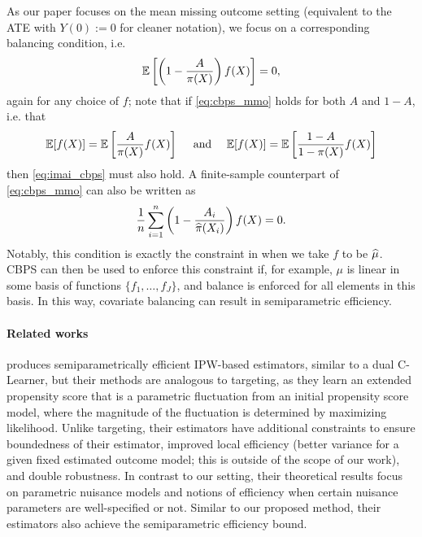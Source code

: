 As our paper focuses on the mean missing outcome setting (equivalent to the ATE with $Y(0):=0$ for cleaner notation), 
we focus on a corresponding balancing condition, i.e. \citep{tan2010bounded}
\begin{align}
\label{eq:cbps_mmo}
\mathbb{E}\left[\left( 1 - \frac{A}{ \pi(X)}\right) f(X) \right]=0,   
\end{align}
again for any choice of $f$; note that if \eqref{eq:cbps_mmo} holds for both $A$ and $1-A$, i.e. that
\begin{align}
\mathbb{E}[f(X)]=\mathbb{E}\left[\frac{A}{ \pi(X)} f(X) \right]
\quad\text{ and }\quad
\mathbb{E}[f(X)]=\mathbb{E}\left[\frac{1-A}{ 1-\pi(X)} f(X) \right]
\end{align}
then \eqref{eq:imai_cbps} must also hold. A finite-sample counterpart of  \eqref{eq:cbps_mmo} can also be written \citep{tan2010bounded} as 
\vspace{-0.3em}
\begin{align}
\label{eq:cbps_mmo_finite}
\frac{1}{n}\sum_{i=1}^n \left(1-\frac{A_i}{\widehat{\pi}(X_i)}\right) f(X) = 0
.\end{align}
Notably, this condition is exactly the constraint in  when we take $f$ to be $\widehat{\mu}$. 
CBPS can then be used to enforce this constraint if, for example, $\mu$ is linear in some basis of functions $\{f_1,\ldots,f_J\}$, and balance is enforced for all elements in this basis. In this way, covariate balancing can result in semiparametric efficiency. 
 


\paragraph{Related works}
\citet{tan2010bounded} produces semiparametrically efficient IPW-based estimators, similar to a dual C-Learner, but their methods are analogous to targeting, as they learn an extended propensity score that is a parametric fluctuation from an initial propensity score model, where the magnitude of the fluctuation is determined by maximizing likelihood. %
Unlike targeting, their estimators have additional constraints to ensure boundedness of their estimator, improved local efficiency (better variance for a given fixed estimated outcome model; this is outside of the scope of our work), and double robustness. In contrast to our setting, their theoretical results focus on parametric nuisance models and notions of efficiency when certain nuisance parameters are well-specified or not. Similar to our proposed method, their estimators also achieve the semiparametric efficiency bound. 






